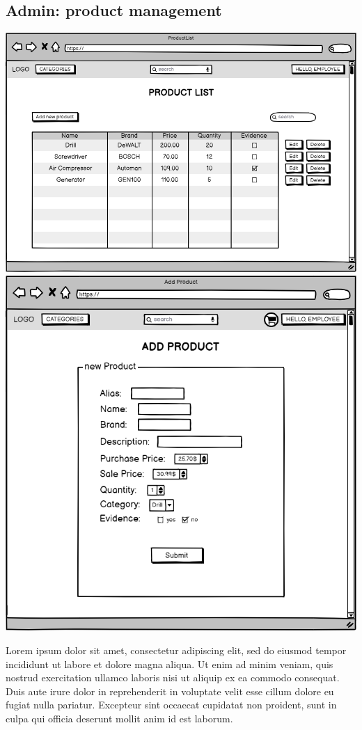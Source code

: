 \subsection{Admin: product management}
    \includegraphics[width=\textwidth,height=\textheight,keepaspectratio]{mockups/productListPageMockup.png}
    \includegraphics[width=\textwidth,height=\textheight,keepaspectratio]{mockups/addProductPageMockup.png}

    Lorem ipsum dolor sit amet, consectetur adipiscing elit, sed do eiusmod tempor incididunt ut labore et dolore magna aliqua. Ut enim ad minim veniam, quis nostrud exercitation ullamco laboris nisi ut aliquip ex ea commodo consequat. Duis aute irure dolor in reprehenderit in voluptate velit esse cillum dolore eu fugiat nulla pariatur. Excepteur sint occaecat cupidatat non proident, sunt in culpa qui officia deserunt mollit anim id est laborum.


